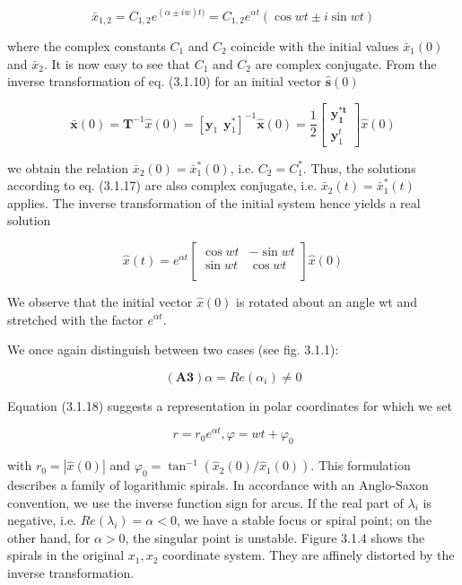 \documentclass[12pt]{article}
\begin{document}
\[
\bar{x}_{1,2}= C_{1,2} e^{(\alpha \pm i w)t)} = C_{1,2}e^{\alpha t} (\cos wt \pm i \sin wt)
\]

where the complex constants $C_1$ and $C_2$ coincide with the initial values $\bar{x}_1(0)$ and
$\bar{x}_2$. It is now easy to see that $C_1$ and $C_2$ are complex conjugate. From the inverse
transformation of eq. (3.1.10) for an initial vector $\hat{\mathbf{s}}(0)$

\[
\bar{\mathbf{x}}(0) = \mathbf{T}^{-1} \hat{x}(0) = [\mathbf{y}_1 \ \ \mathbf{y}_1^*]^{-1} \hat{\mathbf{x}}(0) = \frac{1}{2} \begin{bmatrix}
\mathbf{y_1^{*t}} \\
\mathbf{y}_1^t
\end{bmatrix} \hat{x}(0)
\]

we obtain the relation $\bar{x}_2(0) = \bar{x}_1^*(0)$, i.e. $C_2 = C_1^*$. Thus, the solutions according
to eq. (3.1.17) are also complex conjugate, i.e. $\bar{x}_2(t) = \bar{x}^*_1(t)$ applies. The inverse
transformation of the initial system hence yields a real solution

\[
\hat{x}(t) = e^{\alpha t}\begin{bmatrix}
\cos wt & -\sin wt \\
\sin wt & \cos wt \\
\end{bmatrix} \hat{x}(0)
\]

We observe that the initial vector $\hat{x}(0)$ is rotated about an angle wt and stretched with the factor $e^{\alpha t}$.

\hfill

We once again distinguish between two cases (see fig. 3.1.1):

\[
(\textbf{A3}) \alpha = Re(\alpha_i) \neq 0
\]

Equation (3.1.18) suggests a representation in polar coordinates for which we set

\[
r = r_0 e^{\alpha t}, \varphi= wt + \varphi_0
\]

with $r_0 = | \hat{x}(0)|$ and $\varphi_0 = \tan^{-1}( \hat{x}_2(0)/ \hat{x}_1(0))$. This formulation describes a family
of logarithmic spirals. In accordance with an Anglo-Saxon convention, we use the
inverse function sign for arcus. If the real part of $\lambda_i$ is negative, i.e. $Re(\lambda_i) = \alpha < 0$,
we have a stable focus or spiral point; on the other hand, for $\alpha > 0$, the singular
point is unstable. Figure 3.1.4 shows the spirals in the original $x_1, x_2$ coordinate
system. They are affinely distorted by the inverse transformation.
\end{document}
